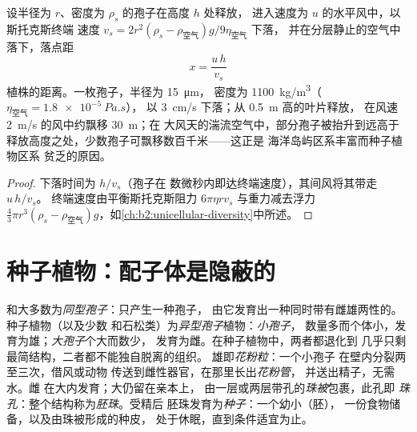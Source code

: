 \begin{theorem}[孢子的扩散]\label{thm:b2:plant-life-cycles:dispersal}
设半径为 $r$、密度为 $\rho_s$ 的孢子在高度 $h$ 处释放，
进入速度为 $u$ 的水平风中，以斯托克斯终端
速度 $v_s = 2r^2(\rho_s - \rho_{\text{空气}})g/9\eta_{\text{空气}}$ 下落，
并在分层静止的空气中落下，落点距
\[
x = \frac{u\,h}{v_s}
\]
植株的距离。一枚孢子，半径为 \qty{15}{\micro m}，
密度为 \qty{1100}{kg/m^3}（$\eta_{\text{空气}} = \qty{1.8e-5}{Pa.s}$），
以 \qty{3}{cm/s} 下落；从 \qty{0.5}{m} 高的叶片释放，
在风速 \qty{2}{m/s} 的风中约飘移 \qty{30}{m}；在
大风天的湍流空气中，部分孢子被抬升到远高于
释放高度之处，少数孢子可飘移数百千米——这正是
海洋岛屿区系丰富而种子植物区系
贫乏的原因。
\end{theorem}
\begin{proof}
下落时间为 $h/v_s$（孢子在
数微秒内即达终端速度），其间风将其带走 $u\,h/v_s$。
终端速度由平衡斯托克斯阻力 $6\pi\eta r
v_s$ 与重力减去浮力 $\tfrac43\pi r^3(\rho_s -
\rho_{\text{空气}})g$，如\cref{ch:b2:unicellular-diversity}中所述。
\end{proof}

\section{种子植物：配子体是隐蔽的}

\begin{definition}[异型孢子性、花粉、胚珠]\label{def:b2:plant-life-cycles:heterospory}
和大多数为\emph{同型孢子}：只产生一种孢子，
由它发育出一种同时带有雌雄两性的。种子植物（以及少数
和石松类）为\emph{异型孢子}植物：\emph{小孢子}，
数量多而个体小，发育为雄；\emph{大孢子}个大而数少，
发育为雌。在种子植物中，两者都退化到
几乎只剩最简结构，二者都不能独自脱离的组织。
雄即\emph{花粉粒}：一个小孢子
在壁内分裂两至三次，借风或动物
传送到雌性器官，在那里长出\emph{花粉管}，
并送出精子，无需水。雌
在大内发育；大仍留在亲本上，
由一层或两层带孔的\emph{珠被}包裹，此孔即
\emph{珠孔}：整个结构称为\emph{胚珠}。受精后
胚珠发育为\emph{种子}：一个幼小（胚），
一份食物储备，以及由珠被形成的种皮，
处于休眠，直到条件适宜为止。
\end{definition}

